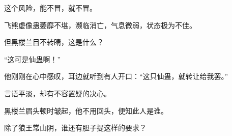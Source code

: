 \begin{this_body}
这个风险，能不冒，就不冒。

飞熊虚像蛊萎靡不堪，濒临消亡，气息微弱，状态极为不佳。

但黑楼兰目不转睛，这是什么？

“这可是仙蛊啊！”

他刚刚在心中感叹，耳边就听到有人开口：“这只仙蛊，就转让给我罢。”

言语平淡，却有不容置疑的决心。

黑楼兰眉头顿时皱起，他不用回头，便知此人是谁。

除了狼王常山阴，谁还有胆子提这样的要求？

\end{this_body}


